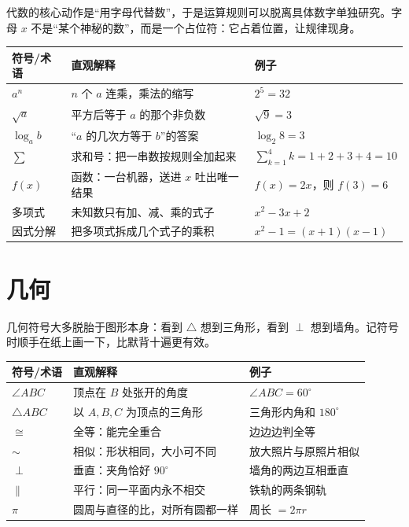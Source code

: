 代数的核心动作是“用字母代替数”，于是运算规则可以脱离具体数字单独研究。字母 $x$ 不是“某个神秘的数”，而是一个占位符：它占着位置，让规律现身。

\begin{center}
\begin{tabular}{lp{4.8cm}p{5.4cm}}
\toprule
符号/术语 & 直观解释 & 例子 \\
\midrule
$a^n$ & $n$ 个 $a$ 连乘，乘法的缩写 & $2^5=32$ \\
$\sqrt{a}$ & 平方后等于 $a$ 的那个非负数 & $\sqrt{9}=3$ \\
$\log_a b$ & “$a$ 的几次方等于 $b$”的答案 & $\log_2 8=3$ \\
$\sum$ & 求和号：把一串数按规则全加起来 & $\sum_{k=1}^{4}k=1+2+3+4=10$ \\
$f(x)$ & 函数：一台机器，送进 $x$ 吐出唯一结果 & $f(x)=2x$，则 $f(3)=6$ \\
多项式 & 未知数只有加、减、乘的式子 & $x^2-3x+2$ \\
因式分解 & 把多项式拆成几个式子的乘积 & $x^2-1=(x+1)(x-1)$ \\
\bottomrule
\end{tabular}
\end{center}

\section{几何}

几何符号大多脱胎于图形本身：看到 $\triangle$ 想到三角形，看到 $\perp$ 想到墙角。记符号时顺手在纸上画一下，比默背十遍更有效。

\begin{center}
\begin{tabular}{lp{4.8cm}p{5.4cm}}
\toprule
符号/术语 & 直观解释 & 例子 \\
\midrule
$\angle ABC$ & 顶点在 $B$ 处张开的角度 & $\angle ABC=60^\circ$ \\
$\triangle ABC$ & 以 $A,B,C$ 为顶点的三角形 & 三角形内角和 $180^\circ$ \\
$\cong$ & 全等：能完全重合 & 边边边判全等 \\
$\sim$ & 相似：形状相同，大小可不同 & 放大照片与原照片相似 \\
$\perp$ & 垂直：夹角恰好 $90^\circ$ & 墙角的两边互相垂直 \\
$\parallel$ & 平行：同一平面内永不相交 & 铁轨的两条钢轨 \\
$\pi$ & 圆周与直径的比，对所有圆都一样 & 周长 $=2\pi r$ \\
\bottomrule
\end{tabular}
\end{center}

